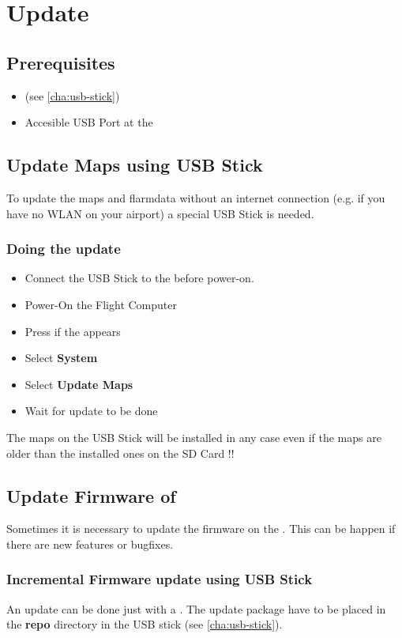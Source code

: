 \chapter{Update}

\section{Prerequisites}

\begin{itemize}
	\item \ovusb (see \autoref{cha:usb-stick})
	\item Accesible USB Port at the \ovfc
\end{itemize}

\section{Update Maps using USB Stick}\label{cha:upd_maps_usb}
To update the maps and flarmdata without an internet connection (e.g. if you have no 
WLAN on your airport) a special USB Stick is needed.

\subsection{Doing the update}
\begin{itemize}
	\item Connect the USB Stick to the \ovfc before power-on.
	\item Power-On the Flight Computer
	\item Press  if the \ovmenu appears
	\item Select \textbf{System}
	\item Select \textbf{Update Maps}
	\item Wait for update to be done
\end{itemize}

\warning The maps on the USB Stick will be installed in any case even if the maps 
are older than the installed ones on the SD Card !!

\section{Update Firmware of \ovfc}\label{cha:upd_fw}
Sometimes it is necessary to update the firmware on the \ovfc. This can be happen if there are new features or bugfixes.

\subsection{Incremental Firmware update using USB Stick}\label{cha:upd_inc_usb}
An update can be done just with a \ovusb.
The update package have to be placed in the \textbf{repo} directory in the USB stick (see \autoref{cha:usb-stick}).

